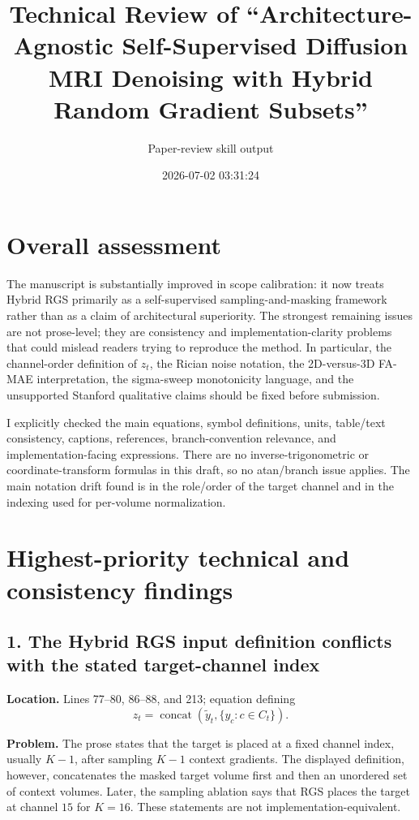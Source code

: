 \documentclass[11pt]{article}
\title{Technical Review of ``Architecture-Agnostic Self-Supervised Diffusion MRI Denoising with Hybrid Random Gradient Subsets''}
\author{Paper-review skill output}
\date{2026-07-02 03:31:24}
\begin{document}
\maketitle

\section*{Overall assessment}

The manuscript is substantially improved in scope calibration: it now treats Hybrid RGS primarily as a self-supervised sampling-and-masking framework rather than as a claim of architectural superiority. The strongest remaining issues are not prose-level; they are consistency and implementation-clarity problems that could mislead readers trying to reproduce the method. In particular, the channel-order definition of $z_t$, the Rician noise notation, the 2D-versus-3D FA-MAE interpretation, the sigma-sweep monotonicity language, and the unsupported Stanford qualitative claims should be fixed before submission.

I explicitly checked the main equations, symbol definitions, units, table/text consistency, captions, references, branch-convention relevance, and implementation-facing expressions. There are no inverse-trigonometric or coordinate-transform formulas in this draft, so no atan/branch issue applies. The main notation drift found is in the role/order of the target channel and in the indexing used for per-volume normalization.

\section*{Highest-priority technical and consistency findings}

\subsection*{1. The Hybrid RGS input definition conflicts with the stated target-channel index}

\textbf{Location.} Lines 77--80, 86--88, and 213; equation defining
\[
  z_t = \operatorname{concat}(\tilde{y}_t, \{y_c : c \in C_t\}).
\]

\textbf{Problem.} The prose states that the target is placed at a fixed channel index, usually $K-1$, after sampling $K-1$ context gradients. The displayed definition, however, concatenates the masked target volume first and then an unordered set of context volumes. Later, the sampling ablation says that RGS places the target at channel $15$ for $K=16$. These statements are not implementation-equivalent.
\end{document}
